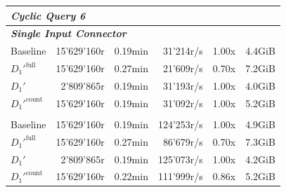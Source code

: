 \begin{longtable}{lrrrrr}
    \multicolumn{6}{l}{\textit{Cyclic Query 6}} \\
    \midrule
    \multicolumn{6}{l}{\textit{\textbf{Single Input Connector}}} \\
    \nopagebreak
    Baseline              &  15'629'160r          &  0.19min            &  31'214r/s            & 1.00x             & 4.4GiB    \\
    $D_1'^{\text{full}}$   &  15'629'160r          &  0.27min            &  21'609r/s            & 0.70x             & 7.2GiB    \\
    \quad $D_1'$           &  2'809'865r           &  0.19min            &  31'193r/s            & 1.00x             & 4.0GiB    \\
    $D_1'^{\text{count}}$  &  15'629'160r          &  0.19min            &  31'092r/s            & 1.00x             & 5.2GiB    \\
    \addlinespace 
    
    \multicolumn{6}{l}{\textit{\textbf{4 Input Connectors}}} \\
    \nopagebreak
    Baseline              &  15'629'160r          &  0.19min            &  124'253r/s           & 1.00x             & 4.9GiB    \\
    $D_1'^{\text{full}}$   &  15'629'160r          &  0.27min            &  86'679r/s            & 0.70x             & 7.3GiB    \\
    \quad $D_1'$           &  2'809'865r           &  0.19min            &  125'073r/s           & 1.00x             & 4.2GiB    \\ 
    $D_1'^{\text{count}}$  &  15'629'160r          &  0.22min            &  111'999r/s           & 0.86x             & 5.2GiB    \\

    \bottomrule

\end{longtable}

